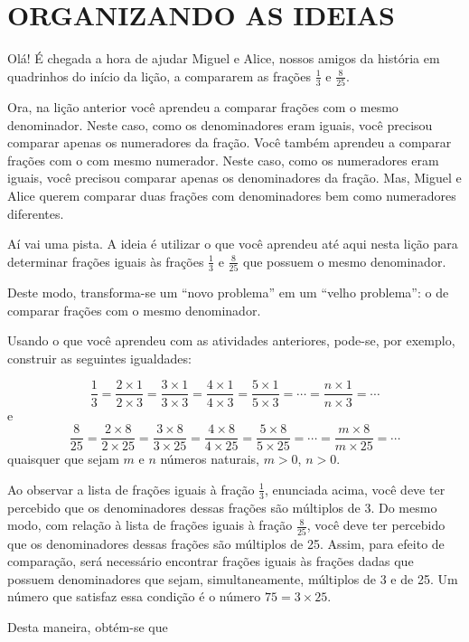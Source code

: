 \section{ORGANIZANDO AS IDEIAS }

Olá! É chegada a hora de ajudar Miguel e Alice, nossos amigos da história em quadrinhos do início da lição, a compararem as frações $\frac{1}{3}$ e $\frac{8}{25}$.

Ora, na lição anterior você aprendeu a comparar frações com o mesmo denominador. Neste caso, como os denominadores eram iguais, você precisou comparar apenas os numeradores da fração. Você também aprendeu a comparar frações com o com mesmo numerador. Neste caso, como os numeradores eram iguais, você precisou comparar apenas os denominadores da fração. Mas, Miguel e Alice querem comparar duas frações com denominadores bem como numeradores diferentes.

Aí vai uma pista.  A ideia é utilizar o que você aprendeu até aqui nesta lição para determinar frações iguais às frações $\frac{1}{3}$ e $\frac{8}{25}$ que possuem o mesmo denominador.

Deste modo, transforma-se um ``novo problema'' em um ``velho problema'': o de comparar frações com o mesmo denominador.

Usando o que você aprendeu com as atividades anteriores, pode-se, por exemplo, construir as seguintes igualdades:

$$\dfrac{1}{3} = \dfrac{2 \times 1}{2 \times 3} = \dfrac{3 \times 1}{3 \times 3} = \dfrac{4 \times 1}{4 \times 3} = \dfrac{5 \times 1}{5 \times 3} = \cdots = \dfrac{n \times 1}{n\times 3} = \cdots$$
e
$$\dfrac{8}{25} = \dfrac{2 \times 8}{2 \times 25} = \dfrac{3 \times 8}{3 \times 25} = \dfrac{4 \times 8}{4 \times 25} = \dfrac{5 \times 8}{5 \times 25} = \cdots = \dfrac{m \times 8}{m\times 25} = \cdots$$
quaisquer que sejam $m$ e $n$ números naturais, $m > 0$, $n > 0$.

Ao observar a lista de frações iguais à fração $\frac{1}{3}$, enunciada acima, você deve ter percebido que os denominadores dessas frações são múltiplos de 3.  Do mesmo modo, com relação à lista de frações iguais à fração $\frac{8}{25}$, você deve ter percebido que os denominadores dessas frações são múltiplos de 25. Assim, para efeito de comparação, será necessário encontrar frações iguais às frações dadas que possuem denominadores que sejam, simultaneamente, múltiplos de 3 e de 25. Um número que satisfaz essa condição é o número $75 = 3 \times 25$.

Desta maneira, obtém-se que

